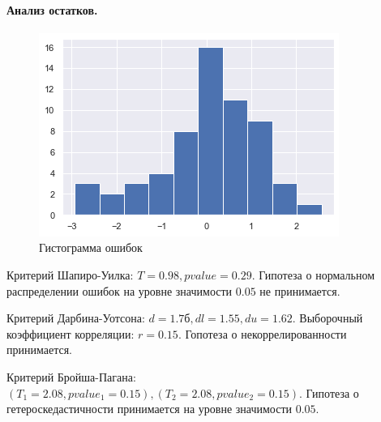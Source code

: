\documentclass[a4paper,12pt]{article}
\begin{document}
\paragraph{Анализ остатков.\\}
\begin{figure}
    \vspace{-2ex}
    \includegraphics[width=\linewidth]{src/img/гистограмма_ошибок_1.png}
    \caption{Гистограмма ошибок}
\end{figure}

Критерий Шапиро-Уилка: $T = 0.98, pvalue = 0.29$. Гипотеза о нормальном распределении ошибок на уровне значимости $0.05$ не принимается.

Критерий Дарбина-Уотсона: $d = 1.7б, dl=1.55, du=1.62$. Выборочный коэффициент корреляции: $r = 0.15$. Гопотеза о некоррелированности принимается.

Критерий Бройша-Пагана: $(T_1 = 2.08, pvalue_1 = 0.15), (T_2 = 2.08, pvalue_2 = 0.15)$. Гипотеза о гетероскедастичности принимается на уровне значимости $0.05$.
\end{document}
